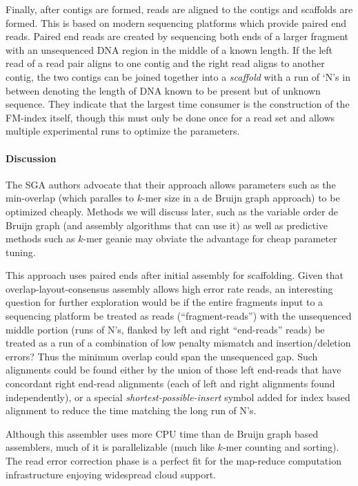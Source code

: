 Finally, after contigs are formed, reads are aligned to the contigs and scaffolds are formed.
This is based on modern sequencing platforms which provide paired end reads.
Paired end reads are created by sequencing both ends of a larger fragment with an unsequenced DNA region in the middle of a known length.
If the left read of a read pair aligns to one contig and the right read aligns to another contig, the two contigs can be joined together into a \emph{scaffold} with a run of `N's in between denoting the length of DNA known to be present but of unknown sequence.
They indicate that the largest time consumer is the construction of the FM-index itself, though this must only be done once for a read set and allows multiple experimental runs to optimize the parameters.%

\paragraph{Discussion}

The SGA authors advocate that their approach allows parameters such as the min-overlap (which paralles to $k$-mer size in a de Bruijn graph approach) to be optimized cheaply.  Methods we will discuss later, such as the variable order de Bruijn graph (and assembly algorithms that can use it) as well as predictive methods such as $k$-mer geanie may obviate the advantage for cheap parameter tuning.

This approach uses paired ends after initial assembly for scaffolding.  Given that overlap-layout-consensus assembly allows high error rate reads, an interesting question for further exploration would be if the entire fragments input to a sequencing platform be treated as reads (``fragment-reads'') with the unsequenced middle portion (runs of N's, flanked by left and right ``end-reads'' reads) be treated as a run of a combination of low penalty mismatch and insertion/deletion errors?  Thus the minimum overlap could span the unsequenced gap. Such alignments could be found either by the union of those left end-reads that have concordant right end-read alignments (each of left and right alignments found independently), or a special \emph{shortest-possible-insert} symbol added for index based alignment to reduce the time matching the long run of N's.

Although this assembler uses more CPU time than de Bruijn graph based assemblers, much of it is parallelizable (much like $k$-mer counting and sorting).  The read error correction phase is a perfect fit for the map-reduce computation infrastructure enjoying widespread cloud support.


